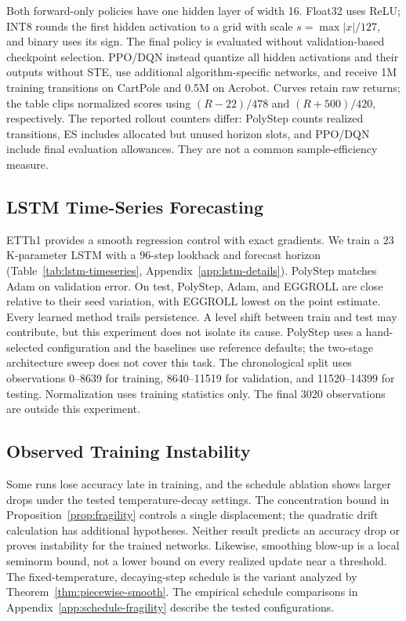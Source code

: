 Both forward-only policies have one hidden layer of width 16. Float32 uses
ReLU; INT8 rounds the first hidden activation to a grid with scale
$s=\max|x|/127$, and binary uses its sign. The final policy is evaluated
without validation-based checkpoint selection. PPO/DQN instead quantize all
hidden activations and their outputs without STE, use additional
algorithm-specific networks, and receive 1M training transitions on CartPole
and 0.5M on Acrobot. Curves retain raw returns; the table clips normalized
scores using $(R-22)/478$ and $(R+500)/420$, respectively. The reported
rollout counters differ: PolyStep counts realized transitions, ES includes
allocated but unused horizon slots, and PPO/DQN include final evaluation
allowances. They are not a common sample-efficiency measure.

\subsection{LSTM Time-Series Forecasting}\label{sec:lstm-timeseries}

ETTh1 provides a smooth regression control with exact gradients. We train a
$23$K-parameter LSTM with a $96$-step lookback and forecast horizon
(Table~\ref{tab:lstm-timeseries}, Appendix~\ref{app:lstm-details}).
PolyStep matches Adam on validation error. On test, PolyStep, Adam, and
EGGROLL are close relative to their seed variation, with EGGROLL lowest on
the point estimate. Every learned method trails persistence. A level shift
between train and test may contribute, but this experiment does not isolate
its cause. PolyStep uses a hand-selected configuration and the baselines use
reference defaults; the two-stage architecture sweep does not cover this task.
The chronological split uses observations 0--8639 for training, 8640--11519
for validation, and 11520--14399 for testing. Normalization uses training
statistics only. The final 3020 observations are outside this experiment.

\subsection{Observed Training Instability}\label{sec:instability}

Some runs lose accuracy late in training, and the schedule ablation shows
larger drops under the tested temperature-decay settings. The concentration
bound in Proposition~\ref{prop:fragility} controls a single displacement;
the quadratic drift calculation has additional hypotheses. Neither result
predicts an accuracy drop or proves instability for the trained networks.
Likewise, smoothing blow-up is a local seminorm bound, not a lower bound
on every realized update near a threshold. The fixed-temperature,
decaying-step schedule is the variant analyzed by
Theorem~\ref{thm:piecewise-smooth}. The empirical schedule comparisons in
Appendix~\ref{app:schedule-fragility} describe the tested configurations.

